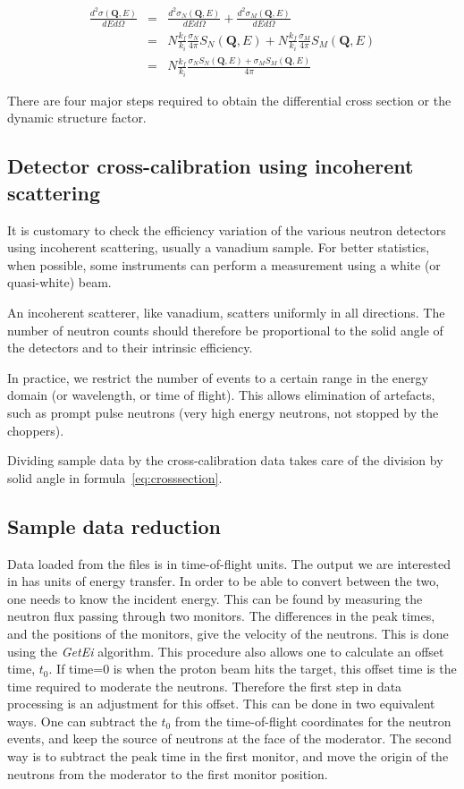 \begin{eqnarray*}
\frac{d^2\sigma(\textbf{Q},E)}{dE d\Omega}&=&\frac{d^2\sigma _N(\textbf{Q},E)}{dE d\Omega}+\frac{d^2\sigma _M(\textbf{Q},E)}{dE d\Omega}\\
&=&N\frac{k_f}{k_i}\frac{\sigma _N}{4\pi} S_N(\textbf{Q},E)+N\frac{k_f}{k_i}\frac{\sigma _M}{4\pi} S_M(\textbf{Q},E)\\
&=&N\frac{k_f}{k_i}\frac{\sigma _N S_N(\textbf{Q},E)+\sigma _M S_M(\textbf{Q},E) } {4\pi}
\end{eqnarray*}

There are four major steps required to obtain the differential cross section or the dynamic structure factor.

\subsection{Detector cross-calibration using incoherent scattering}
It is customary to check the efficiency variation of the various neutron detectors using incoherent scattering, usually a vanadium sample. For better statistics, when possible, some instruments can perform a measurement using a white (or quasi-white) beam.

An incoherent scatterer, like vanadium, scatters uniformly in all directions. The number of neutron counts should therefore be proportional to the solid angle of the detectors and to their intrinsic efficiency. 

In practice, we restrict the number of events to a certain range in the energy domain (or wavelength, or time of flight). This allows elimination of artefacts, such as prompt pulse neutrons (very high energy neutrons, not stopped by the choppers).

Dividing sample data by the cross-calibration data takes care of the division by solid angle in formula~\ref{eq:crosssection}. 


\subsection{Sample data reduction} 
Data loaded from the files is in time-of-flight units. The output we are interested in has units of energy transfer. In order to be able to convert between the two, one needs to know the incident energy. This can be found by measuring the neutron flux passing through two monitors. The differences in the peak times, and the positions of the monitors, give the velocity of the neutrons. This is done using the \textit{GetEi} algorithm. This procedure also allows one to calculate an offset time, $t_0$. If time=0 is when the proton beam hits the target, this offset time is the time required to moderate the neutrons. Therefore the first step in data processing is an adjustment for this offset. This can be done in two equivalent ways. One can subtract the  $t_0$ from the time-of-flight coordinates for the neutron events, and keep the source of neutrons at the face of the moderator. The second way is to subtract the peak time in the first monitor, and move the origin of the neutrons from the moderator to the first monitor position.

